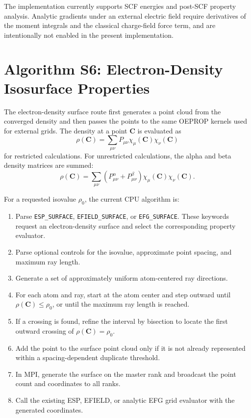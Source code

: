 \documentclass[journal=jcisd8,manuscript=suppinfo]{achemso}
\begin{document}
The implementation currently supports SCF energies and post-SCF property analysis.  Analytic gradients under an external electric field require derivatives of the moment integrals and the classical charge-field force term, and are intentionally not enabled in the present implementation.

\section{Algorithm S6: Electron-Density Isosurface Properties}

The electron-density surface route first generates a point cloud from the converged density and then passes the points to the same OEPROP kernels used for external grids.  The density at a point \(\mathbf{C}\) is evaluated as
\begin{equation}
  \rho(\mathbf{C})
  =
  \sum_{\mu\nu}P_{\mu\nu}\chi_\mu(\mathbf{C})\chi_\nu(\mathbf{C})
\end{equation}
for restricted calculations.  For unrestricted calculations, the alpha and beta density matrices are summed:
\begin{equation}
  \rho(\mathbf{C})
  =
  \sum_{\mu\nu}\left(P^\alpha_{\mu\nu}+P^\beta_{\mu\nu}\right)
  \chi_\mu(\mathbf{C})\chi_\nu(\mathbf{C}).
\end{equation}

For a requested isovalue \(\rho_0\), the current CPU algorithm is:
\begin{enumerate}
  \item Parse \texttt{ESP\_SURFACE}, \texttt{EFIELD\_SURFACE}, or \texttt{EFG\_SURFACE}.  These keywords request an electron-density surface and select the corresponding property evaluator.
  \item Parse optional controls for the isovalue, approximate point spacing, and maximum ray length.
  \item Generate a set of approximately uniform atom-centered ray directions.
  \item For each atom and ray, start at the atom center and step outward until \(\rho(\mathbf{C})\le \rho_0\), or until the maximum ray length is reached.
  \item If a crossing is found, refine the interval by bisection to locate the first outward crossing of \(\rho(\mathbf{C})=\rho_0\).
  \item Add the point to the surface point cloud only if it is not already represented within a spacing-dependent duplicate threshold.
  \item In MPI, generate the surface on the master rank and broadcast the point count and coordinates to all ranks.
  \item Call the existing ESP, EFIELD, or analytic EFG grid evaluator with the generated coordinates.
\end{enumerate}
\end{document}
